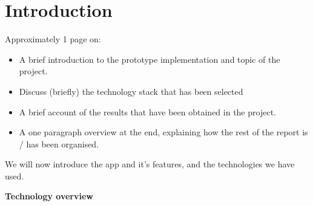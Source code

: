 \section{Introduction}
\label{sec:introduction}

Approximately 1 page on:

\begin{itemize}

\item A brief introduction to the prototype implementation and topic of the project.

\item Discuss (briefly) the technology stack that has been selected

\item A brief account of the results that have been obtained in the project.

\item A one paragraph overview at the end, explaining how the rest of the report is / has been organised.

\end{itemize}


We will now introduce the app and it's features, and the technologies we have used.


\textbf{Technology overview}


